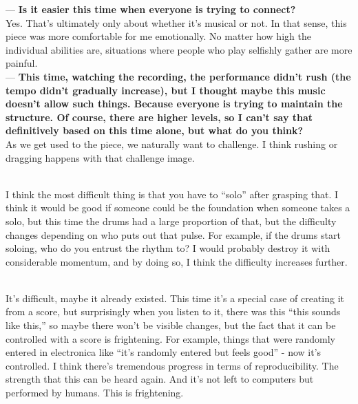 \begin{description}
--- {\bf Is it easier this time when everyone is trying to connect?}\\

Yes. That's ultimately only about whether it's musical or not. In that sense, this piece was more comfortable for me emotionally. No matter how high the individual abilities are, situations where people who play selfishly gather are more painful.\\

--- {\bf This time, watching the recording, the performance didn't rush (the tempo didn't gradually increase), but I thought maybe this music doesn't allow such things. Because everyone is trying to maintain the structure. Of course, there are higher levels, so I can't say that definitively based on this time alone, but what do you think?}\\

As we get used to the piece, we naturally want to challenge. I think rushing or dragging happens with that challenge image.\\

\item [Where do you think the difficulty of live performance lies?]\mbox{}\\

I think the most difficult thing is that you have to ``solo'' after grasping that. I think it would be good if someone could be the foundation when someone takes a solo, but this time the drums had a large proportion of that, but the difficulty changes depending on who puts out that pulse. For example, if the drums start soloing, who do you entrust the rhythm to? I would probably destroy it with considerable momentum, and by doing so, I think the difficulty increases further.\\

\item [How do you think about the development potential of this work and method?]\mbox{}\\

It's difficult, maybe it already existed. This time it's a special case of creating it from a score, but surprisingly when you listen to it, there was this ``this sounds like this,'' so maybe there won't be visible changes, but the fact that it can be controlled with a score is frightening. For example, things that were randomly entered in electronica like ``it's randomly entered but feels good'' - now it's controlled. I think there's tremendous progress in terms of reproducibility. The strength that this can be heard again. And it's not left to computers but performed by humans. This is frightening.


\end{description}
